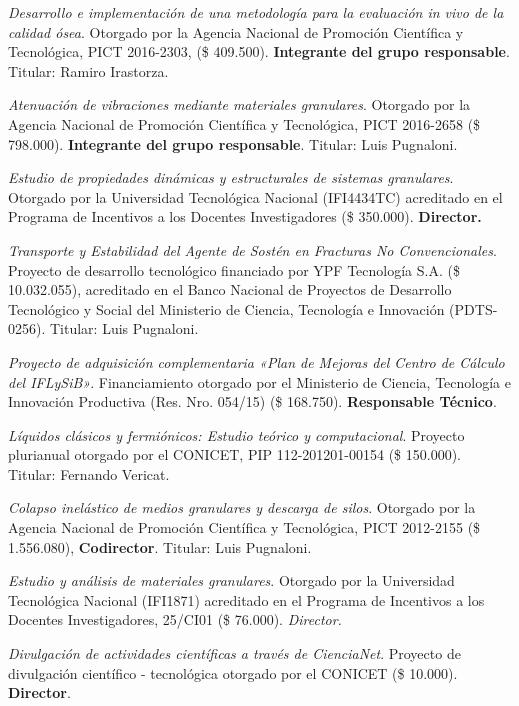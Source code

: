  \textit{Desarrollo e implementación de una metodología para la evaluación \textit{in vivo} de la calidad ósea}. Otorgado por la Agencia Nacional de Promoción Científica y Tecnológica, PICT 2016-2303, (\$ 409.500). \textbf{Integrante del grupo responsable}. Titular: Ramiro Irastorza.

 \textit{Atenuación de vibraciones mediante materiales granulares}. Otorgado por la Agencia Nacional de Promoción Científica y Tecnológica, PICT 2016-2658 (\$ 798.000). \textbf{Integrante del grupo responsable}. Titular: Luis Pugnaloni.

 \textit{Estudio de propiedades dinámicas y estructurales de sistemas granulares}. Otorgado por la Universidad Tecnológica Nacional (IFI4434TC) acreditado en el Programa de Incentivos a los Docentes Investigadores (\$ 350.000). \textbf{Director.}

 \textit{Transporte y Estabilidad del Agente de Sostén en Fracturas No Convencionales}. Proyecto de desarrollo tecnológico financiado por YPF Tecnología S.A. (\$ 10.032.055), acreditado en el Banco Nacional de Proyectos de Desarrollo Tecnológico y Social del Ministerio de Ciencia, Tecnología e Innovación (PDTS-0256). Titular: Luis Pugnaloni.

 \textit{Proyecto de adquisición complementaria «Plan de Mejoras del Centro de Cálculo del IFLySiB»}. Financiamiento otorgado por el Ministerio de Ciencia, Tecnología e Innovación Productiva (Res. Nro. 054/15) (\$ 168.750). \textbf{Responsable Técnico}.

  \textit{Líquidos clásicos y fermiónicos: Estudio teórico y computacional}. Proyecto plurianual otorgado por el CONICET, PIP 112-201201-00154 (\$ 150.000). Titular: Fernando Vericat.

 \textit{Colapso inelástico de medios granulares y descarga de silos}. Otorgado por la Agencia Nacional de Promoción Científica y Tecnológica, PICT 2012-2155 (\$ 1.556.080), \textbf{Codirector}. Titular: Luis Pugnaloni.

 \textit{Estudio y análisis de materiales granulares}. Otorgado por la Universidad Tecnológica Nacional (IFI1871) acreditado en el Programa de Incentivos a los Docentes Investigadores, 25/CI01 (\$ 76.000). \textit{Director.}

 \textit{Divulgación de actividades científicas a través de CienciaNet}. Proyecto de divulgación científico - tecnológica otorgado por el CONICET (\$ 10.000). \textbf{Director}.


